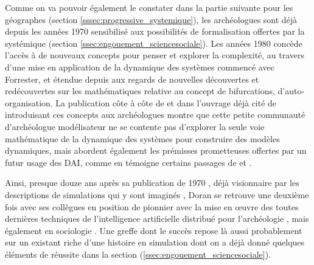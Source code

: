 Comme on va pouvoir également le constater dans la partie suivante pour les géographes (section \ref{sssec:progressive_systemique}), les archéologues sont déjà depuis les années 1970 sensibilisé aux possibilités de formalisation offertes par la systémique (section \ref{ssec:engouement_sciencesociale}). Les années 1980 concède l'accès à de nouveaux concepts pour penser et explorer la complexité, au travers d'une mise en application de la dynamique des systèmes commencé avec Forrester, et étendue depuis aux regards de nouvelles découvertes et redécouvertes sur les mathématiques relative au concept de bifurcations, d'auto-organisation. La publication côte à côte de \textcite{Doran1982} et \textcite{Allen1982} dans l'ouvrage déjà cité de \textcite{Renfrew1982} introduisant ces concepts aux archéologues montre que cette petite communauté d'archéologue modélisateur ne se contente pas d'explorer la seule voie mathématique de la dynamique des systèmes pour construire des modèles dynamiques, mais abordent également les prémisses prometteuses  offertes par un futur usage des DAI, comme en témoigne certains passages de \textcite{Doran1982}  et \textcite{Doran1986b} .

Ainsi, presque douze ans après sa publication de 1970 \autocite{Doran1970}, déjà visionnaire par les descriptions de simulations qui y sont imaginés , Doran se retrouve une deuxième fois avec ses collègues en position de pionnier avec la mise en œuvre des toutes dernières techniques de l'intelligence artificielle distribué pour l'archéologie , mais également en sociologie \autocite{Doran1985}. Une greffe dont le succès repose là aussi probablement sur un existant riche d'une histoire en simulation dont on a déjà donné quelques éléments de réussite dans la section (\ref{ssec:engouement_sciencesociale}).




